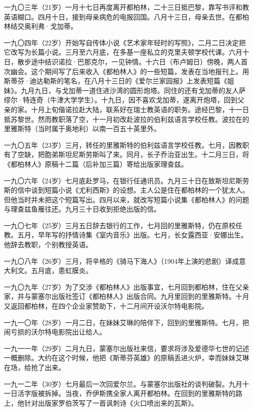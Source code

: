 \par 一九〇三年（21岁）一月十七日再度离开都柏林，二十三日抵巴黎，靠写书评和教英语糊口。四月十日，接到母亲病危的电报回国。八月十三日，母亲去世。在都柏林结交奥利弗·戈加蒂。
\par 一九〇四年（22岁）开始写自传体小说《艺术家年轻时的写照》，二月二日决定把它改写为长篇小说。三月至六月底，在多基一座私立的克里夫顿学校代课。六月十日，散步途中结识诺拉·巴那克尔，一见钟情。十六日（布卢姆日）傍晚，两人首次幽会。这个期间写了后来收入《都柏林人》的一些短篇，发表在当地报刊上。用斯蒂芬·迪达勒斯的笔名，在八月十三日的《爱尔兰家园报》上发表短篇《姐妹》。九月九日，与戈加蒂一道住进沙湾的圆形炮塔。同住的还有戈加蒂的友人萨缪尔·特连奇（牛津大学学生）。十九日，因不喜欢戈加蒂，遂离开炮塔，回到父亲的家。十月上旬偕诺拉赴大陆，联系好在瑞士教英语的职务。途经巴黎，十一日抵苏黎世。然而教职落了空，十一月初改赴波拉的伯利兹语言学校任教。波拉在的里雅斯特（当时属于奥地利）以南一百五十英里外。
\par 一九〇五年（23岁）三月，转任的里雅斯特的伯利兹语言学校任教。七月，因教职有了空缺，把胞弟斯坦尼斯劳斯叫了来。同月，长子乔治亚出生。十二月三日，将《都柏林人》原稿十二篇（后补加三篇）寄给出版家理查兹。
\par 一九〇六年（24岁）七月底赴罗马，在银行任通讯员。九月三十日在致斯坦尼斯劳斯的信中谈到短篇小说《尤利西斯》的设想。主人公是住在都柏林的一个犹太人。但他当时并未把这个短篇写出。四月以来，就改写短篇小说集《都柏林人》的问题与理查兹鱼雁往还。九月三十日收到拒绝出版的信。
\par 一九〇七年（25岁）三月五日辞去银行的工作，七月回的里雅斯特，仍在原校任教。五月，早年写的抒情诗集《室内音乐》出版。七月，长女露西亚·安娜出生。他辞去教职，个别教授英语。
\par 一九〇八年（26岁）三月，将辛格的《骑马下海人》（1904年上演的悲剧）译成意大利文。五月底，患虹膜炎。
\par 一九〇九年（27岁）为了交涉《都柏林人》出版事宜，七月回到都柏林，住在父亲家，并与蒙塞尔出版社签订《都柏林人》出版合同。九月里回到的里雅斯特。十月又返回都柏林，在四个企业家赞助下，十二月间开设沃尔特电影院。
\par 一九一〇年（28岁）一月二日，在妹妹艾琳的陪伴下，回到的里雅斯特。七月，把闹亏损的沃尔特电影院出让给人。
\par 一九一一年（29岁）二月九日，蒙塞尔出版社来信，要求将涉及爱德华七世的记述一概删除。大约在这个时候，他把《斯蒂芬英雄》的原稿丢进火炉，幸而妹妹艾琳在场，给抢了出来。
\par 一九一二年（30岁）七月最后一次回爱尔兰。与蒙塞尔出版社的谈判破裂。九月十一日活字版被拆掉。当夜，乔伊斯携全家人离开都柏林。在回到的里雅斯特的路上，他针对出版家罗伯茨写了一首讽刺诗《火口喷出来的瓦斯》。
